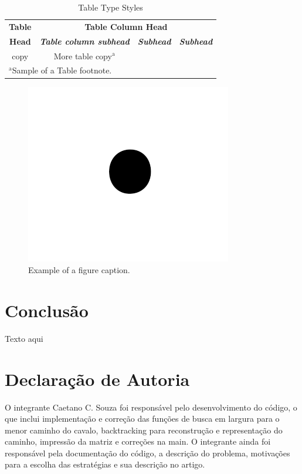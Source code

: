 \documentclass[relatorio]{IEEEtran}
\begin{document}
\begin{table}[htbp]
\caption{Table Type Styles}
\begin{center}
\begin{tabular}{|c|c|c|c|}
\hline
\textbf{Table}&\multicolumn{3}{|c|}{\textbf{Table Column Head}} \\
\cline{2-4} 
\textbf{Head} & \textbf{\textit{Table column subhead}}& \textbf{\textit{Subhead}}& \textbf{\textit{Subhead}} \\
\hline
copy& More table copy$^{\mathrm{a}}$& &  \\
\hline
\multicolumn{4}{l}{$^{\mathrm{a}}$Sample of a Table footnote.}
\end{tabular}
\label{tab1}
\end{center}
\end{table}

\begin{figure}[htbp]
\centerline{\includegraphics{fig1.png}}
\caption{Example of a figure caption.}
\label{fig}
\end{figure}


\section{Conclusão}
Texto aqui

\section{Declaração de Autoria}
O integrante Caetano C. Souza foi responsável pelo desenvolvimento do código, o que inclui implementação e correção das funções de busca em largura para o menor caminho do cavalo, backtracking para reconstrução e representação do caminho, impressão da matriz e correções na main. O integrante ainda foi responsável pela documentação do código, a descrição do problema, motivações para a escolha das estratégias e sua descrição no artigo. 
\end{document}
